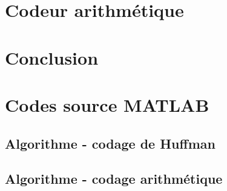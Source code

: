 \documentclass[a4paper, 12pt]{article}
\newcommand{\FSource}[1]{%

}
\begin{document}
\section{Codeur arithmétique}

\section{Conclusion}


\clearpage
\appendix

\section{Codes source MATLAB}
\subsection{Algorithme - codage de Huffman}\label{algohuffman}

\FSource{../huffman.m}

\newpage
\subsection{Algorithme - codage arithmétique}\label{algoarithmetique}

\FSource{../arith.m}
\end{document}
